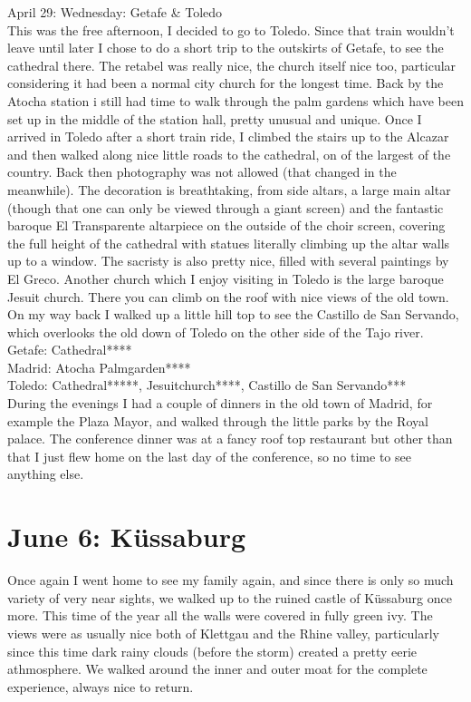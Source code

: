 April 29: Wednesday: Getafe \& Toledo\\
This was the free afternoon, I decided to go to Toledo. Since that train wouldn't leave until later I chose to do a short trip to the outskirts of Getafe, to see the cathedral there. The retabel was really nice, the church itself nice too, particular considering it had been a normal city church for the longest time. Back by the Atocha station i still had time to walk through the palm gardens which have been set up in the middle of the station hall, pretty unusual and unique. Once I arrived in Toledo after a short train ride, I climbed the stairs up to the Alcazar and then walked along nice little roads to the cathedral, on of the largest of the country. Back then photography was not allowed (that changed in the meanwhile). The decoration is breathtaking, from side altars, a large main altar (though that one can only be viewed through a giant screen) and the fantastic baroque El Transparente altarpiece on the outside of the choir screen, covering the full height of the cathedral with statues literally climbing up the altar walls up to a window. The sacristy is also pretty nice, filled with several paintings by El Greco. Another church which I enjoy visiting in Toledo is the large baroque Jesuit church. There you can climb on the roof with nice views of the old town. On my way back I walked up a little hill top to see the Castillo de San Servando, which overlooks the old down of Toledo on the other side of the Tajo river.\\

Getafe: Cathedral****\\
Madrid: Atocha Palmgarden****\\
Toledo: Cathedral*****, Jesuitchurch****, Castillo de San Servando***\\

During the evenings I had a couple of dinners in the old town of Madrid, for example the Plaza Mayor, and walked through the little parks by the Royal palace. The conference dinner was at a fancy roof top restaurant but other than that I just flew home on the last day of the conference, so no time to see anything else.

\section{June 6: K\"ussaburg}
\label{2009:Kuessaburg}

Once again I went home to see my family again, and since there is only so much variety of very near sights, we walked up to the ruined castle of K\"ussaburg once more. This time of the year all the walls were covered in fully green ivy. The views were as usually nice both of Klettgau and the Rhine valley, particularly since this time dark rainy clouds (before the storm) created a pretty eerie athmosphere. We walked around the inner and outer moat for the complete experience, always nice to return.\\

